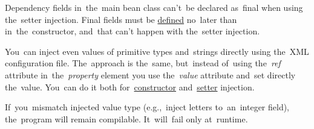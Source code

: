 \warning Dependency fields in~the~main bean class can't~be declared as~final when using the~setter injection. Final fields must be \hyperref[declarationdefinition]{defined} no~later than in~the~constructor, and~that can't happen with the~setter injection.

\enlargethispage{20mm}
\thispagestyle{empty}
\label{injectingliteralvalues}
You~can inject even values of primitive types and~strings directly using the~XML configuration file. The~approach is the~same, but~instead of~using the~\textit{ref} attribute in~the~\textit{property} element you use the~\textit{value} attribute and~set directly the~value. You~can do it both for~\hyperref[constructorinjection]{constructor} and~\hyperref[setterinjection]{setter} injection.

\warning If~you~mismatch injected value type (e.g.,~inject letters to~an~integer field), the~program will remain compilable. It~will~fail only at~runtime.
\newpage

